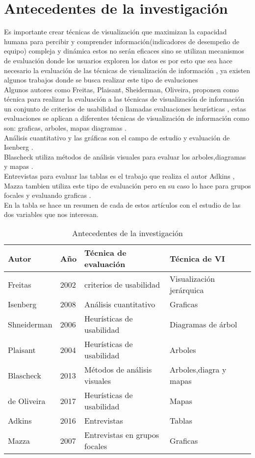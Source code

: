 \section{Antecedentes de la investigación}
Es importante crear técnicas de visualización que maximizan la capacidad humana para percibir y comprender información(indicadores de desempeño de equipo) compleja y dinámica estos no serán eficaces sino se utilizan mecanismos de evaluación donde los usuarios exploren los datos\cite{theron} es por esto que sea hace necesario la evaluación de las técnicas de visualización de información , ya existen algunos trabajos donde se busca realizar este tipo de evaluciones\\
Algunos autores como Freitas, Plaisant, Sheiderman, Oliveira, proponen como técnica para realizar la evaluación a las técnicas de visualización de información un conjunto de criterios de usabilidad o llamadas evaluaciones heurísticas \cite {freitas} , estas evaluaciones se aplican a diferentes técnicas de visualización de información como son: graficas, arboles, mapas diagramas \cite{shneiderman}.\\
Análisis cuantitativo y las gráficas son el campo de estudio y evaluación de Isenberg \cite{isenberg}.\\
Blascheck utiliza métodos de análisis visuales para evaluar los arboles,diagramas y mapas \cite{blascheck}.\\
Entrevistas para evaluar las tablas es el trabajo que realiza el autor Adkins \cite{adkins}, Mazza tambien utiliza este tipo de evaluación pero en su caso lo hace para grupos focales y evaluando graficas \cite{mazza}.\\
En la tabla se hace un resumen de cada de estos artículos con el estudio de las dos variables que nos interesan.
\begin{table}[H]
\centering
\begin{tabular}{p{2cm} p{1cm} p{5cm} p{4cm} p{4cm}}
\hline
Autor & Año  & Técnica de evaluación & Técnica de VI \\
\hline \hline
Freitas & 2002 & criterios de usabilidad& Visualización jerárquica  \\
\hline
Isenberg & 2008  & Análisis cuantitativo & Graficas  \\
\hline
Shneiderman & 2006 & Heurísticas de usabilidad  & Diagramas de árbol  \\
\hline
Plaisant & 2004 & Heurísticas de usabilidad & Arboles  \\
\hline
Blascheck & 2013 & Métodos de análisis visuales & Arboles,diagra y mapas  \\
\hline
de Oliveira & 2017 & Heurísticas de usabilidad & Mapas  \\
\hline
Adkins & 2016 & Entrevistas & Tablas  \\
\hline
Mazza & 2007 & Entrevistas en grupos focales & Graficas  \\
\hline
\end{tabular}
\caption{Antecedentes de la investigación}
\label{tabla:autores}
\end{table}
